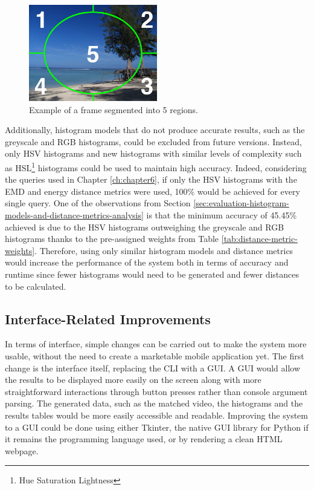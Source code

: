 \begin{figure}[h] 
\centerline{\includegraphics[width=0.5\textwidth]{figures/conclusions/image_regions.jpg}}
\caption{\label{fig:conclusions-image_regions}Example of a frame segmented into 5 regions.}
\end{figure}

Additionally, histogram models that do not produce accurate results, such as the greyscale and RGB histograms, could be excluded from future versions. Instead, only HSV histograms and new histograms with similar levels of complexity such as HSL\footnote{Hue Saturation Lightness} histograms could be used to maintain high accuracy. Indeed, considering the queries used in Chapter \ref{ch:chapter6}, if only the HSV histograms with the EMD and energy distance metrics were used, 100\% would be achieved for every single query. One of the observations from Section \ref{sec:evaluation-histogram-models-and-distance-metrics-analysis} is that the minimum accuracy of 45.45\% achieved is due to the HSV histograms outweighing the greyscale and RGB histograms thanks to the pre-assigned weights from Table \ref{tab:distance-metric-weights}. Therefore, using only similar histogram models and distance metrics would increase the performance of the system both in terms of accuracy and runtime since fewer histograms would need to be generated and fewer distances to be calculated.

\subsection{Interface-Related Improvements}

In terms of interface, simple changes can be carried out to make the system more usable, without the need to create a marketable mobile application yet. The first change is the interface itself, replacing the CLI with a GUI. A GUI would allow the results to be displayed more easily on the screen along with more straightforward interactions through button presses rather than console argument parsing. The generated data, such as the matched video, the histograms and the results tables would be more easily accessible and readable. Improving the system to a GUI could be done using either Tkinter, the native GUI library for Python if it remains the programming language used, or by rendering a clean HTML webpage.\\

